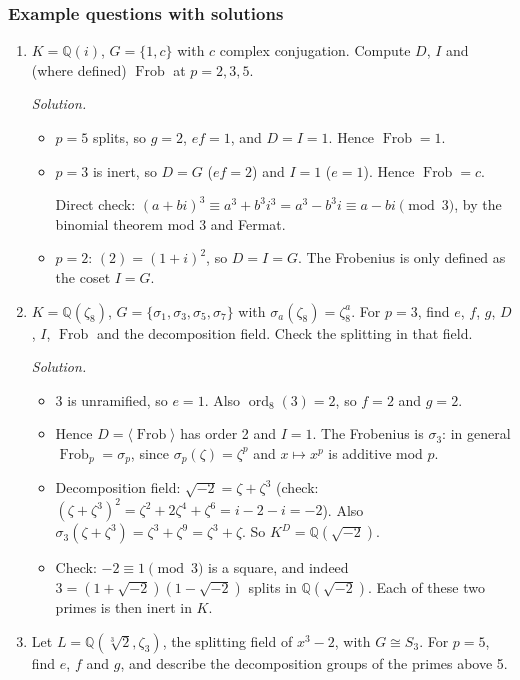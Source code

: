 \documentclass[11pt]{article}
\newcommand{\Q}{\mathbb{Q}}
\DeclareMathOperator{\Frob}{Frob}
\DeclareMathOperator{\ord}{ord}
\begin{document}
\subsubsection*{Example questions with solutions}
\begin{enumerate}[label=\textbf{Q7.\arabic*}]
  \item $K=\Q(i)$, $G=\{1,c\}$ with $c$ complex conjugation. Compute $D$, $I$ and (where defined) $\Frob$ at $p=2,3,5$.

  \textit{Solution.}
  \begin{itemize}
    \item $p=5$ splits, so $g=2$, $ef=1$, and $D=I=1$. Hence $\Frob=1$.
    \item $p=3$ is inert, so $D=G$ ($ef=2$) and $I=1$ ($e=1$). Hence $\Frob=c$.

    Direct check: $(a+bi)^3\equiv a^3+b^3i^3=a^3-b^3i\equiv a-bi\pmod 3$, by the binomial theorem mod 3 and Fermat.
    \item $p=2$: $(2)=(1+i)^2$, so $D=I=G$. The Frobenius is only defined as the coset $I=G$.
  \end{itemize}

  \item $K=\Q(\zeta_8)$, $G=\{\sigma_1,\sigma_3,\sigma_5,\sigma_7\}$ with $\sigma_a(\zeta_8)=\zeta_8^a$. For $p=3$, find $e$, $f$, $g$, $D$, $I$, $\Frob$ and the decomposition field. Check the splitting in that field.

  \textit{Solution.}
  \begin{itemize}
    \item 3 is unramified, so $e=1$. Also $\ord_8(3)=2$, so $f=2$ and $g=2$.
    \item Hence $D=\langle\Frob\rangle$ has order 2 and $I=1$. The Frobenius is $\sigma_3$: in general $\Frob_p=\sigma_p$, since $\sigma_p(\zeta)=\zeta^p$ and $x\mapsto x^p$ is additive mod $p$.
    \item Decomposition field: $\sqrt{-2}=\zeta+\zeta^3$ (check: $(\zeta+\zeta^3)^2=\zeta^2+2\zeta^4+\zeta^6=i-2-i=-2$). Also $\sigma_3(\zeta+\zeta^3)=\zeta^3+\zeta^9=\zeta^3+\zeta$. So $K^D=\Q(\sqrt{-2})$.
    \item Check: $-2\equiv1\pmod 3$ is a square, and indeed $3=(1+\sqrt{-2})(1-\sqrt{-2})$ splits in $\Q(\sqrt{-2})$. Each of these two primes is then inert in $K$.
  \end{itemize}

  \item Let $L=\Q(\sqrt[3]2,\zeta_3)$, the splitting field of $x^3-2$, with $G\cong S_3$. For $p=5$, find $e$, $f$ and $g$, and describe the decomposition groups of the primes above 5.


\end{enumerate}
\end{document}
